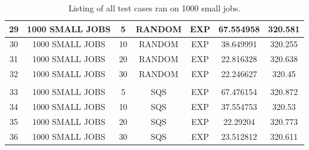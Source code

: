 \documentclass{article}
\begin{document}
\begin{table}
\begin{tabular}{|c | c | c | c | c | c | c |}
29 & 1000 SMALL JOBS & 5  & RANDOM     & EXP               & 67.554958 & 320.581 \\ \hline
30 & 1000 SMALL JOBS & 10 & RANDOM     & EXP               & 38.649991 & 320.255 \\ \hline
31 & 1000 SMALL JOBS & 20 & RANDOM     & EXP               & 22.816328 & 320.638 \\ \hline
32 & 1000 SMALL JOBS & 30 & RANDOM     & EXP               & 22.246627 & 320.45  \\ \hline
   &                 &    &            &                   &           &         \\ \hline
33 & 1000 SMALL JOBS & 5  & SQS        & EXP               & 67.476154 & 320.872 \\ \hline
34 & 1000 SMALL JOBS & 10 & SQS        & EXP               & 37.554753 & 320.53  \\ \hline
35 & 1000 SMALL JOBS & 20 & SQS        & EXP               & 22.29204  & 320.773 \\ \hline
36 & 1000 SMALL JOBS & 30 & SQS        & EXP               & 23.512812 & 320.611 \\ 
\hline
\end{tabular}

\caption{Listing of all test cases ran on 1000 small jobs. \label{smallJobsTable}}
\end{table}


\end{document}
